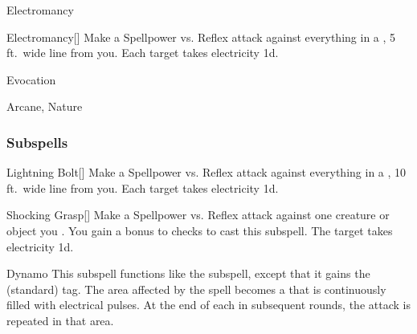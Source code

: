 \newpage
\begin{spellsection}{Electromancy}

\begin{spellheader}
\end{spellheader}


\begin{ability}{Electromancy}[]
Make a Spellpower vs. Reflex attack against everything in a \areamed, 5 ft.\ wide line from you.
\hit Each target takes electricity  \minus1d.
\end{ability}




 Evocation

 Arcane, Nature
\end{spellsection}


\subsubsection{Subspells}


\begin{ability}[\nth{1}]{Lightning Bolt}[]
Make a Spellpower vs. Reflex attack against everything in a \arealarge, 10 ft.\ wide line from you.
\hit Each target takes electricity  \minus1d.
\end{ability}
\vspace{0.25em}


\begin{ability}[\nth{1}]{Shocking Grasp}[]
Make a Spellpower vs. Reflex attack against one creature or object you .
You gain a  bonus to  checks to cast this subspell.
\hit The target takes electricity  \plus1d.
\end{ability}
\vspace{0.25em}


\begin{ability}[\nth{2}]{Dynamo}
This subspell functions like the  subspell, except that it gains the  (standard) tag.
The area affected by the spell becomes a  that is continuously filled with electrical pulses.
At the end of each  in subsequent rounds, the attack is repeated in that area.
\end{ability}
\vspace{0.25em}


